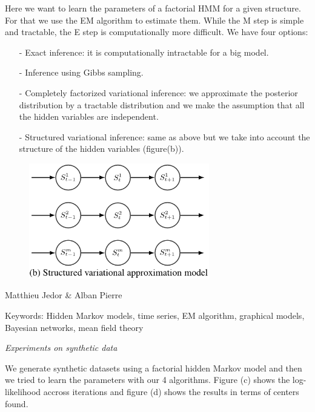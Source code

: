 \documentclass[10pt,a4paper]{report}
\begin{document}
\Large{

Here we want to learn the parameters of a factorial HMM for a given structure. For that we use the EM algorithm to estimate them. While the M step is simple and tractable, the E step is computationally more difficult. We have four options:

\begin{itemize}
	\item[-]Exact inference: it is computationally intractable for a big model.
	\item[-]Inference using Gibbs sampling.
	\item[-]Completely factorized variational inference: we approximate the posterior distribution by a tractable distribution and we make the assumption that all the hidden variables are independent.
	\item[-]Structured variational inference: same as above but we take into account the structure of the hidden variables (figure(b)).
\end{itemize}
\vspace{20pt}
}

\begin{figure}[h]
	\centering
	\includegraphics[width=0.7\textwidth]{sva.png}
	\label{fig:b}
\end{figure}








\newpage
\begin{center}
\end{center}
\vspace{5pt}
\begin{center}
	\LARGE{Matthieu Jedor \& Alban Pierre}
	\vspace{15pt}
	
	\Large{Keywords: Hidden Markov models, time series, EM algorithm, graphical models, Bayesian networks, mean field
theory}
\end{center}
\vspace{30pt}
\begin{center}
\Huge{\textit{Experiments on synthetic data}}
\end{center}
\vspace{20pt}
\Large{
	
	We generate synthetic datasets using a factorial hidden Markov model and then we tried to learn the parameters with our 4 algorithms. Figure (c) shows the log-likelihood accross iterations and figure (d) shows the results in terms of centers found.
	
}
\end{document}
